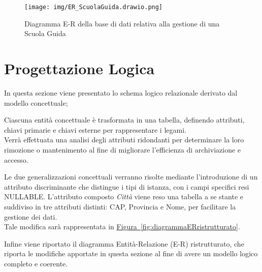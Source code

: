 \documentclass[10pt,twoside]{article}
\begin{document}
\begin{figure}[h]        
    \texttt{[image: img/ER\_ScuolaGuida.drawio.png]}\centering
    \caption{Diagramma E-R della base di dati relativa alla gestione di una Scuola Guida}
    \label{fig:diagrammaER}
\end{figure}

\newpage

\section{Progettazione Logica}{
    In questa sezione viene presentato lo schema logico relazionale derivato dal modello concettuale;
    
    Ciascuna entità concettuale è trasformata in una tabella, definendo attributi, chiavi primarie e chiavi esterne per rappresentare i legami. \\
    Verrà effettuata una analisi degli attributi ridondanti per determinare la loro rimozione o mantenimento al fine di migliorare l’efficienza di archiviazione e accesso.
    
    Le due generalizzazioni concettuali verranno risolte mediante l’introduzione di un attributo discriminante che distingue i tipi di istanza, con i campi specifici resi NULLABLE.
    L'attributo composto \textit{Città} viene reso una tabella a se stante e suddiviso in tre attributi distinti: CAP, Provincia e Nome, per facilitare la gestione dei dati. \\
    Tale modifica sarà rappresentata in \hyperref[fig:diagrammaERristrutturato]{Figura~\ref*{fig:diagrammaERristrutturato}}.


    Infine viene riportato il diagramma Entità-Relazione (E-R) ristrutturato, che riporta le modifiche apportate in questa sezione al fine di avere un modello logico completo e coerente.

}
\end{document}
